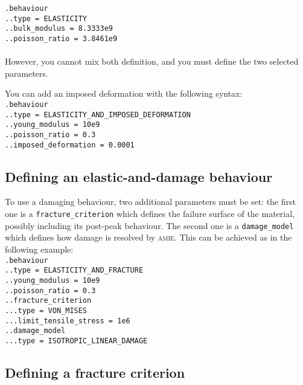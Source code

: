 \documentclass[10pt]{article}
\begin{document}
\noindent \verb+.behaviour+\\
\verb+..type = ELASTICITY+\\
\verb+..bulk_modulus = 8.3333e9+\\
\verb+..poisson_ratio = 3.8461e9+

\paragraph{} However, you cannot mix both definition, and you must define the two selected parameters.

You can add an imposed deformation with the following syntax:\\

\noindent \verb+.behaviour+\\
\verb+..type = ELASTICITY_AND_IMPOSED_DEFORMATION+\\
\verb+..young_modulus = 10e9+\\
\verb+..poisson_ratio = 0.3+\\
\verb+..imposed_deformation = 0.0001+

\subsection{Defining an elastic-and-damage behaviour}

To use a damaging behaviour, two additional parameters must be set: the first one is a \verb+fracture_criterion+ which defines the failure surface of the material, possibly including its post-peak behaviour. The second one is a \verb+damage_model+ which defines how damage is resolved by \textsc{amie}. This can be achieved as in the following example:\\

\noindent \verb+.behaviour+\\
\verb+..type = ELASTICITY_AND_FRACTURE+\\
\verb+..young_modulus = 10e9+\\
\verb+..poisson_ratio = 0.3+\\
\verb+..fracture_criterion+\\
\verb+...type = VON_MISES+\\
\verb+...limit_tensile_stress = 1e6+\\
\verb+..damage_model+\\
\verb+...type = ISOTROPIC_LINEAR_DAMAGE+

\subsection{Defining a fracture criterion}
\end{document}
